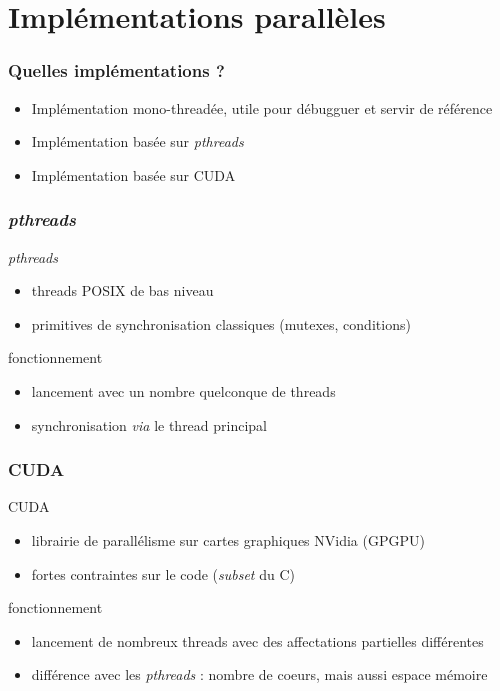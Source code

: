 \documentclass{beamer}
\newcommand{\cuda}{\textsc{CUDA}}
\begin{document}


\section{Implémentations parallèles}
\begin{frame}
\frametitle{Quelles implémentations ?}

\begin{itemize}
    \item Implémentation mono-threadée, utile pour débugguer et servir de référence
    \pause
    \item Implémentation basée sur \emph{pthreads}
    \pause
    \item Implémentation basée sur \cuda
\end{itemize}
\end{frame}

\begin{frame}
\frametitle{\emph{pthreads}}

\begin{block}{\emph{pthreads}}
\begin{itemize}
    \item threads \textsc{POSIX} de bas niveau
    \item primitives de synchronisation classiques (mutexes, conditions)
\end{itemize}
\end{block}
\pause

\begin{block}{fonctionnement}
\begin{itemize}
    \item lancement avec un nombre quelconque de threads
    \item synchronisation \emph{via} le thread principal
\end{itemize}
\end{block}
\end{frame}



\begin{frame}
\frametitle{\cuda}

\begin{block}{\cuda}
\begin{itemize}
    \item librairie de parallélisme sur cartes graphiques NVidia (GPGPU)
    \item fortes contraintes sur le code (\emph{subset} du C)
\end{itemize}
\end{block}
\pause
\begin{block}{fonctionnement}
\begin{itemize}
    \item lancement de nombreux threads avec des affectations partielles différentes
    \item différence avec les \emph{pthreads} : nombre de coeurs, mais aussi espace mémoire
\end{itemize}
\end{block}
\end{frame}
\end{document}
